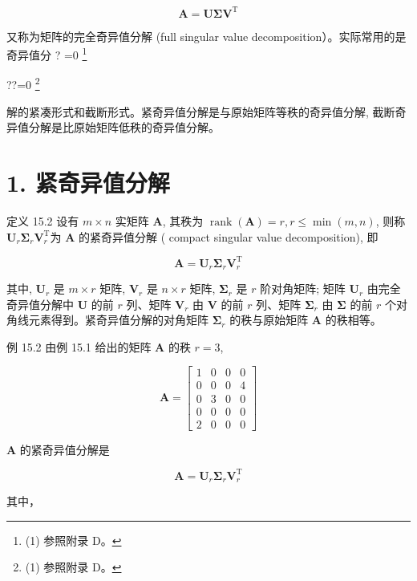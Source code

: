 \documentclass[10pt]{article}
\let\svthefootnote\thefootnote
\newcommand\blfootnotetext[1]{%
  \let\thefootnote\relax\footnote{#1}%
  \addtocounter{footnote}{-1}%
  \let\thefootnote\svthefootnote%
}
\let\svfootnotetext\footnotetext
\renewcommand\footnotetext[2][?]{%
  \if\relax#1\relax%
    \ifnum\value{footnote}=0\blfootnotetext{#2}\else\svfootnotetext{#2}\fi%
  \else%
    \if?#1\ifnum\value{footnote}=0\blfootnotetext{#2}\else\svfootnotetext{#2}\fi%
    \else\svfootnotetext[#1]{#2}\fi%
  \fi
}
\begin{document}
$$
\boldsymbol{A}=\boldsymbol{U} \boldsymbol{\Sigma} \boldsymbol{V}^{\mathrm{T}}
$$

又称为矩阵的完全奇异值分解 (full singular value decomposition）。实际常用的是奇异值分
解的紧凑形式和截断形式。紧奇异值分解是与原始矩阵等秩的奇异值分解, 截断奇异值分解是比原始矩阵低秩的奇异值分解。

\section*{1. 紧奇异值分解}
定义 15.2 设有 $m \times n$ 实矩阵 $\boldsymbol{A}$, 其秩为 $\operatorname{rank}(\boldsymbol{A})=r, r \leqslant \min (m, n)$, 则称 $\boldsymbol{U}_{r} \boldsymbol{\Sigma}_{r} \boldsymbol{V}_{r}^{\mathrm{T}}$为 $\boldsymbol{A}$ 的紧奇异值分解 ( compact singular value decomposition), 即


\begin{equation*}
\boldsymbol{A}=\boldsymbol{U}_{r} \boldsymbol{\Sigma}_{r} \boldsymbol{V}_{r}^{\mathrm{T}} \tag{15.18}
\end{equation*}


其中, $\boldsymbol{U}_{r}$ 是 $m \times r$ 矩阵, $\boldsymbol{V}_{r}$ 是 $n \times r$ 矩阵, $\boldsymbol{\Sigma}_{r}$ 是 $r$ 阶对角矩阵; 矩阵 $\boldsymbol{U}_{r}$ 由完全奇异值分解中 $\boldsymbol{U}$ 的前 $r$ 列、矩阵 $\boldsymbol{V}_{r}$ 由 $\boldsymbol{V}$ 的前 $r$ 列、矩阵 $\boldsymbol{\Sigma}_{r}$ 由 $\boldsymbol{\Sigma}$ 的前 $r$ 个对角线元素得到。紧奇异值分解的对角矩阵 $\boldsymbol{\Sigma}_{r}$ 的秩与原始矩阵 $\boldsymbol{A}$ 的秩相等。

例 15.2 由例 15.1 给出的矩阵 $\boldsymbol{A}$ 的秩 $r=3$,

$$
\boldsymbol{A}=\left[\begin{array}{llll}
1 & 0 & 0 & 0 \\
0 & 0 & 0 & 4 \\
0 & 3 & 0 & 0 \\
0 & 0 & 0 & 0 \\
2 & 0 & 0 & 0
\end{array}\right]
$$

$\boldsymbol{A}$ 的紧奇异值分解是

$$
\boldsymbol{A}=\boldsymbol{U}_{r} \boldsymbol{\Sigma}_{r} \boldsymbol{V}_{r}^{\mathrm{T}}
$$

其中，
\end{document}
